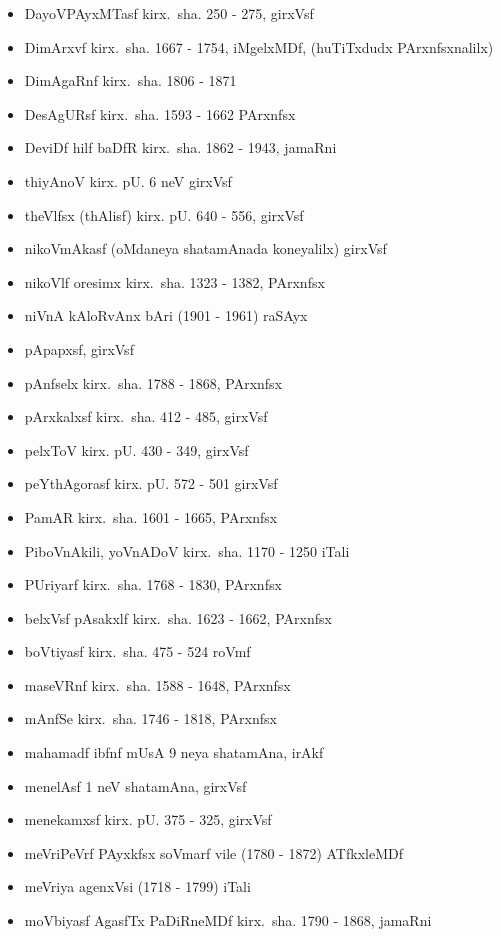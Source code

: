 {\begin{itemize}
\item DayoVPAyxMTasf kirx.~sha. {\rm 250 - 275}, girxVsf
\item DimArxvf kirx.~sha. {\rm 1667 - 1754}, iMgelxMDf, (huTiTxdudx PArxnfsxnalilx)
\item DimAgaRnf kirx.~sha. {\rm 1806 - 1871}
\item DesAgURsf kirx.~sha. {\rm 1593 - 1662} PArxnfsx
\item DeviDf hilf baDfR kirx.~sha. {\rm 1862 - 1943}, jamaRni
\item thiyAnoV kirx. pU. {\rm 6} neV girxVsf
\item theVlfsx (thAlisf) kirx. pU. {\rm 640 - 556}, girxVsf
\item nikoVmAkasf (oMdaneya shatamAnada koneyalilx) girxVsf
\item nikoVlf oresimx kirx.~sha. {\rm 1323 - 1382}, PArxnfsx
\item niVnA kAloRvAnx bAri {\rm (1901 - 1961)} raSAyx
\item pApapxsf, girxVsf
\item pAnfselx kirx.~sha. {\rm 1788 - 1868}, PArxnfsx
\item pArxkalxsf kirx.~sha. {\rm 412 - 485}, girxVsf
\item pelxToV kirx. pU. {\rm 430 - 349}, girxVsf
\item peYthAgorasf kirx. pU. {\rm 572 - 501} girxVsf
\item PamAR kirx.~sha. {\rm 1601 - 1665}, PArxnfsx
\item PiboVnAkili, yoVnADoV kirx.~sha. {\rm 1170 - 1250} iTali
\item PUriyarf kirx.~sha. {\rm 1768 - 1830}, PArxnfsx
\item belxVsf pAsakxlf kirx.~sha. {\rm 1623 - 1662}, PArxnfsx
\item boVtiyasf kirx.~sha. {\rm 475 - 524} roVmf
\item maseVRnf kirx.~sha. {\rm 1588 - 1648}, PArxnfsx
\item mAnfSe kirx.~sha. {\rm 1746 - 1818}, PArxnfsx
\item mahamadf ibfnf mUsA {\rm 9} neya shatamAna, irAkf
\item menelAsf {\rm 1} neV shatamAna, girxVsf
\item menekamxsf kirx. pU. {\rm 375 - 325}, girxVsf 
\item meVriPeVrf PAyxkfsx soVmarf vile {\rm (1780 - 1872)} ATfkxleMDf
\item meVriya agenxVsi {\rm (1718 - 1799)} iTali
\item moVbiyasf AgasfTx PaDiRneMDf kirx.~sha. {\rm 1790 - 1868}, jamaRni

\end{itemize}}
